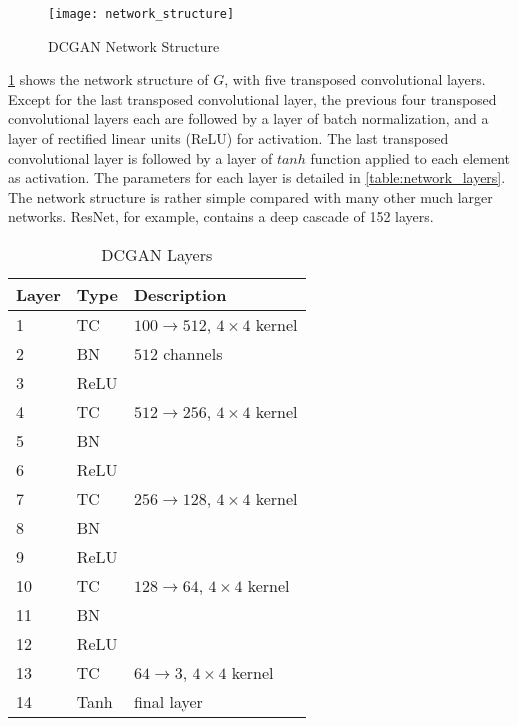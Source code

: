 \begin{figure}[h]
  \centering
  \texttt{[image: network\_structure]}
  \caption{DCGAN Network Structure}
  \label{fig:network_structure}
\end{figure}

\ref{fig:network_structure} shows the network structure of $G$, with five transposed convolutional layers.
Except for the last transposed convolutional layer, the previous four transposed convolutional layers each
are followed by a layer of batch normalization, and a layer of rectified linear units (ReLU) for
activation. The last transposed convolutional layer is followed by a layer of $tanh$ function applied to
each element as activation. The parameters for each layer is detailed in \ref{table:network_layers}.
The network structure is rather simple compared with many other much larger networks. ResNet, for example,
contains a deep cascade of 152 layers.

\begin{table}[h]
  \centering
  \caption{DCGAN Layers}
  \begin{tabular}{l | l | l }
    \toprule
    Layer & Type & Description \\
    \midrule
    1 & TC & $100 \rightarrow 512$, $4 \times 4$ kernel\\
    2 & BN & $512$ channels\\
    3 & ReLU & \\
    4 & TC & $512 \rightarrow 256$, $4 \times 4$ kernel\\
    5 & BN & \\
    6 & ReLU & \\
    7 & TC & $256 \rightarrow 128$, $4 \times 4$ kernel\\
    8 & BN & \\
    9 & ReLU & \\
    10 & TC & $128 \rightarrow 64$, $4 \times 4$ kernel\\
    11 & BN &\\
    12 & ReLU & \\
    13 & TC & $64 \rightarrow 3$, $4 \times 4$ kernel\\
    14 & Tanh & final layer \\
    \bottomrule
  \end{tabular}
  \label{table:memory_requirements}
\end{table}

\clearpage %
